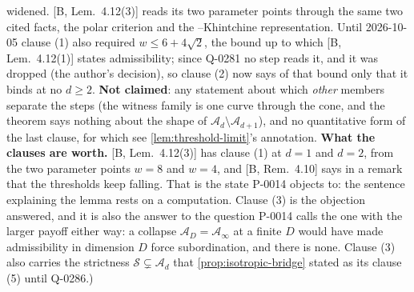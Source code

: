 \begin{theorem}
{widened. [B, Lem.~4.12(3)] reads its two parameter points through the same two cited facts, the
polar criterion and the \Levy--Khintchine representation. Until 2026-10-05 clause (1) also
required $w \le 6 + 4\sqrt2$, the bound up to which [B, Lem.~4.12(1)] states admissibility; since
Q-0281 no step reads it, and it was dropped (the author's decision), so clause (2) now says of that
bound only that it binds at no $d \ge 2$. \textbf{Not claimed}: any statement about
which \emph{other} members separate the steps (the witness family is one curve through the cone,
and the theorem says nothing about the shape of $\mathcal{A}_d \setminus \mathcal{A}_{d+1}$), and no
quantitative form of the last clause, for which see \ref{lem:threshold-limit}'s annotation.
\textbf{What the clauses are worth.} [B, Lem.~4.12(3)] has clause (1) at $d = 1$ and $d = 2$,
from the two parameter points $w = 8$ and $w = 4$, and [B, Rem.~4.10] says in a remark that the
thresholds keep falling. That is the state P-0014 objects to: the sentence explaining the lemma
rests on a computation. Clause (3) is the objection answered, and it is also the answer to the
question P-0014 calls the one with the larger payoff either way: a collapse
$\mathcal{A}_D = \mathcal{A}_\infty$ at a finite $D$ would have made admissibility in dimension $D$
force subordination, and there is none. Clause (3) also carries the strictness
$\mathcal{S} \subsetneq \mathcal{A}_d$ that \ref{prop:isotropic-bridge} stated as its clause (5)
until Q-0286.)}
\end{theorem}

